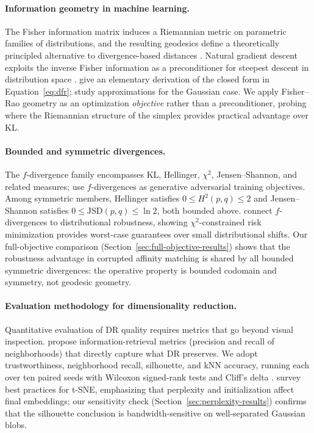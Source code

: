 \documentclass[11pt]{article}
\begin{document}
\paragraph{Information geometry in machine learning.}
The Fisher information matrix induces a Riemannian metric on parametric families of
distributions, and the resulting geodesics define a theoretically principled alternative to
divergence-based distances \citep{rao1945information,amari2016information}.
Natural gradient descent exploits the inverse Fisher information as a preconditioner for
steepest descent in distribution space \citep{amari2016information}.
\citet{nielsen2020elementary} give an elementary derivation of the closed form in
Equation~\eqref{eq:dfr}; \citet{nielsen2023fishrao} study approximations for the Gaussian
case.
We apply Fisher--Rao geometry as an optimization \emph{objective} rather than a preconditioner,
probing where the Riemannian structure of the simplex provides practical advantage over KL.

\paragraph{Bounded and symmetric divergences.}
The $f$-divergence family encompasses KL, Hellinger, $\chi^2$, Jensen--Shannon, and related
measures; \citet{nowozin2016fgan} use $f$-divergences as generative adversarial training
objectives.
Among symmetric members, Hellinger satisfies $0\le H^2(p,q)\le 2$ and Jensen--Shannon
satisfies $0\le\mathrm{JSD}(p,q)\le\ln 2$, both bounded above.
\citet{duchi2021learning} connect $f$-divergences to distributional robustness, showing
$\chi^2$-constrained risk minimization provides worst-case guarantees over small
distributional shifts.
Our full-objective comparison (Section~\ref{sec:full-objective-results}) shows that the
robustness advantage in corrupted affinity matching is shared by all bounded symmetric
divergences: the operative property is bounded codomain and symmetry, not geodesic geometry.

\paragraph{Evaluation methodology for dimensionality reduction.}
Quantitative evaluation of DR quality requires metrics that go beyond visual inspection.
\citet{venna2010information} propose information-retrieval metrics (precision and recall of
neighborhoods) that directly capture what DR preserves.
We adopt trustworthiness, neighborhood recall, silhouette, and kNN accuracy, running each
over ten paired seeds with Wilcoxon signed-rank tests and Cliff's delta \citep{wilcoxon1945individual,cliff1993dominance}.
\citet{kobak2019art} survey best practices for t-SNE, emphasizing that perplexity and
initialization affect final embeddings; our sensitivity check (Section~\ref{sec:perplexity-results})
confirms that the silhouette conclusion is bandwidth-sensitive on well-separated Gaussian blobs.
\end{document}
